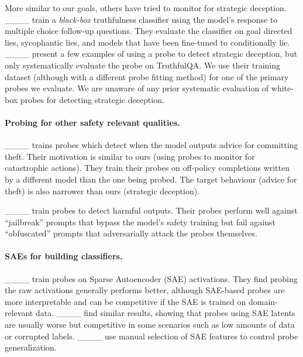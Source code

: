 More similar to our goals, others have tried to monitor for strategic deception.
____ train a \emph{black-box} truthfulness classifier using the model's
response to multiple choice follow-up questions.
They evaluate the classifier on goal directed lies, sycophantic lies, and models that have been fine-tuned to
conditionally lie.
____ present a few examples of using a probe to detect strategic deception, but only
systematically evaluate the probe on TruthfulQA.
We use their training dataset (although with a different probe fitting method) for one of the primary probes we evaluate.
We are unaware of any prior systematic evaluation of white-box probes for detecting strategic deception.

\paragraph{Probing for other safety relevant qualities.} ____ trains probes which detect when the model outputs advice for
committing theft. Their motivation is similar to ours (using probes to monitor for catastrophic actions).
They train their probes on off-policy completions written by a different model than the one being probed.
The target behaviour (advice for theft) is also narrower than ours (strategic deception).


____ train probes to detect harmful outputs.
Their probes perform well against \enquote{jailbreak} prompts that bypass the model's safety training but fail against \enquote{obfuscated} prompts that adversarially attack the probes themselves.

\paragraph{SAEs for building classifiers.} ____ train probes on Sparse Autoencoder (SAE) activations.
They find probing the raw activations generally performs better, although SAE-based probes are more interpretable and can be competitive if the SAE is trained on domain-relevant data.
____ find similar results, showing that probes using SAE latents are usually worse but competitive in some scenarios such as low amounts of data or corrupted labels.
____ use manual selection of SAE features to control probe generalization.
